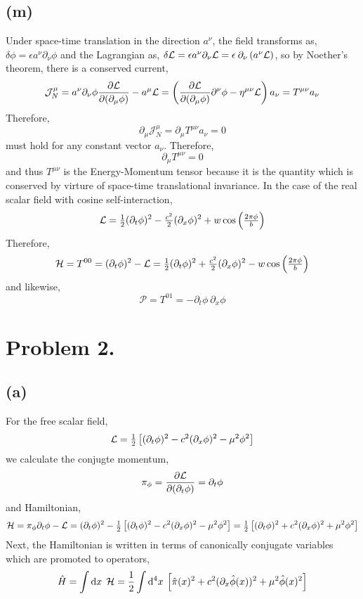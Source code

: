 \documentclass[12pt]{extarticle}
\begin{document}
\subsection*{(m)}
Under space-time translation in the direction $a^\nu$, the field transforms as, $\delta \phi = \epsilon a^\nu \partial_\nu \phi$ and the Lagrangian as, $\delta \mathcal{L} = \epsilon a^{\nu} \partial_\nu \mathcal{L} = \epsilon \: \partial_\nu \left(a^\nu \mathcal{L} \right)$, so by Noether's theorem, there is a conserved current, 
\[ \mathcal{J}_N^\mu = a^\nu \partial_\nu \phi \frac{\partial{\mathcal{L}}}{\partial{(\partial_\mu \phi)}} -  a^{\mu} \mathcal{L} = \left( \frac{\partial{\mathcal{L}}}{\partial{(\partial_\mu \phi)}} \partial^\nu \phi  - \eta^{\mu \nu} \mathcal{L} \right) a_\nu  = T^{\mu \nu}  a_\nu\]
Therefore,
\[ \partial_\mu \mathcal{J}_N^\mu = \partial_\mu T^{\mu \nu}  a_\nu = 0\]
must hold for any constant vector $a_\nu$. Therefore, 
\[ \partial_\mu T^{\mu \nu}  = 0 \]
and thus $T^{\mu \nu}$ is the Energy-Momentum tensor because it is the quantity which is conserved by virture of space-time translational invariance. In the case of the real scalar field with cosine self-interaction,
\[ \mathcal{L} = \tfrac{1}{2} (\partial_t \phi)^2 - \tfrac{c^2}{2} (\partial_x \phi)^2 + w \cos \left(\tfrac{2 \pi \phi}{b} \right) \]
Therefore,
\[ \mathcal{H} = T^{00} =  (\partial_t \phi)^2 - \mathcal{L} = \tfrac{1}{2} (\partial_t \phi)^2 + \tfrac{c^2}{2} (\partial_x \phi)^2 - w \cos \left(\tfrac{2 \pi \phi}{b} \right) \]
and likewise,
\[ \mathcal{P} = T^{01} = - \partial_t \phi \: \partial_x \phi  \]
\section*{Problem 2.}

\subsection*{(a)}
For the free scalar field,
\[ \mathcal{L} = \tfrac{1}{2} \left[ (\partial_t \phi)^2 - c^2 (\partial_x \phi)^2 - \mu^2 \phi^2 \right] \]
we calculate the conjugte momentum,
\[ \pi_{\phi} = \frac{\partial{\mathcal{L}}}{\partial{(\partial_t \phi)}} = \partial_t \phi \]
and Hamiltonian,
\begin{align*}
\mathcal{H} =  \pi_\phi \partial_t \phi - \mathcal{L} = (\partial_t \phi)^2 - \tfrac{1}{2} \left[ (\partial_t \phi)^2 - c^2 (\partial_x \phi)^2 - \mu^2 \phi^2 \right] = \tfrac{1}{2} \left[ (\partial_t \phi)^2 + c^2 (\partial_x \phi)^2 + \mu^2 \phi^2 \right]
\end{align*}
Next, the Hamiltonian is written in terms of canonically conjugate variables which are promoted to operators,
\[ \hat{H} =  \int \mathrm{d}x \: \: \mathcal{H} =  \frac{1}{2} \int \mathrm{d}^4 x\: \left[ \hat{\pi}(x)^2 + c^2 (\partial_x \hat{\phi}(x))^2 + \mu^2 \hat{\phi}(x)^2 \right]\]
\end{document}
